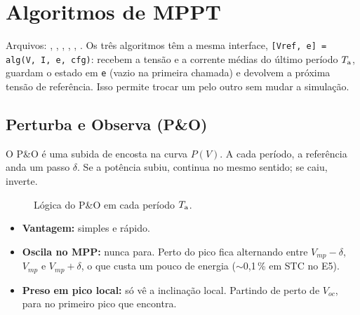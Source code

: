\section{Algoritmos de MPPT}\label{sec:mppt}

Arquivos: , , , , ,
. Os tr\^es algoritmos t\^em a mesma interface,
\texttt{[Vref, e] = alg(V, I, e, cfg)}: recebem a tens\~ao e a corrente m\'edias do \'ultimo per\'iodo $T_{\mathrm{a}}$,
guardam o estado em \texttt{e} (vazio na primeira chamada) e devolvem a pr\'oxima tens\~ao de refer\^encia. Isso permite
trocar um pelo outro sem mudar a simula\c{c}\~ao.

\subsection{Perturba e Observa (P\&O)}

O P\&O \'e uma subida de encosta na curva $P(V)$. A cada per\'iodo, a refer\^encia anda um passo $\delta$. Se a pot\^encia
subiu, continua no mesmo sentido; se caiu, inverte.

\begin{figure}[htbp]
\centering
{}
\caption{L\'ogica do P\&O em cada per\'iodo $T_{\mathrm{a}}$.}
\label{fig:po}
\end{figure}

\begin{itemize}
\item \textbf{Vantagem:} simples e r\'apido.
\item \textbf{Oscila no MPP:} nunca para. Perto do pico fica alternando entre $V_{mp}-\delta$, $V_{mp}$ e $V_{mp}+\delta$, o que custa um pouco
 de energia ($\sim$0,1\,\% em STC no E5).
\item \textbf{Preso em pico local:} s\'o v\^e a inclina\c{c}\~ao local. Partindo de perto de $V_{oc}$, para no primeiro pico que encontra.
\end{itemize}

